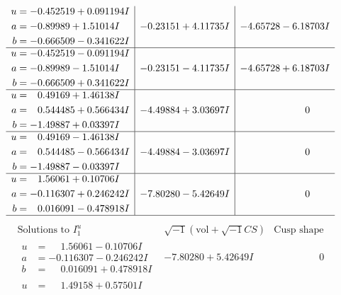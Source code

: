 \documentclass[1p]{elsarticle_modified}
\theoremstyle{definition}
\newcommand{\I}{\sqrt{-1}}
\begin{document}
$$\begin{array}{c|c|c}
\begin{aligned}
u &= -0.452519 + 0.091194 I \\
a &= -0.89989 + 1.51014 I \\
b &= -0.666509 - 0.341622 I\end{aligned}
 & -0.23151 + 4.11735 I & -4.65728 - 6.18703 I \\ \hline\begin{aligned}
u &= -0.452519 - 0.091194 I \\
a &= -0.89989 - 1.51014 I \\
b &= -0.666509 + 0.341622 I\end{aligned}
 & -0.23151 - 4.11735 I & -4.65728 + 6.18703 I \\ \hline\begin{aligned}
u &= \phantom{-}0.49169 + 1.46138 I \\
a &= \phantom{-}0.544485 + 0.566434 I \\
b &= -1.49887 + 0.03397 I\end{aligned}
 & -4.49884 + 3.03697 I & \phantom{-0.000000 } 0 \\ \hline\begin{aligned}
u &= \phantom{-}0.49169 - 1.46138 I \\
a &= \phantom{-}0.544485 - 0.566434 I \\
b &= -1.49887 - 0.03397 I\end{aligned}
 & -4.49884 - 3.03697 I & \phantom{-0.000000 } 0 \\ \hline\begin{aligned}
u &= \phantom{-}1.56061 + 0.10706 I \\
a &= -0.116307 + 0.246242 I \\
b &= \phantom{-}0.016091 - 0.478918 I\end{aligned}
 & -7.80280 - 5.42649 I & \phantom{-0.000000 } 0\\
 \hline 
 \end{array}$$\newpage$$\begin{array}{c|c|c}  
\text{Solutions to }I^u_{1}& \I (\text{vol} + \sqrt{-1}CS) & \text{Cusp shape}\\
 \hline 
\begin{aligned}
u &= \phantom{-}1.56061 - 0.10706 I \\
a &= -0.116307 - 0.246242 I \\
b &= \phantom{-}0.016091 + 0.478918 I\end{aligned}
 & -7.80280 + 5.42649 I & \phantom{-0.000000 } 0 \\ \hline\begin{aligned}
u &= \phantom{-}1.49158 + 0.57501 I \\

\end{aligned}
\end{array}$$
\end{document}
